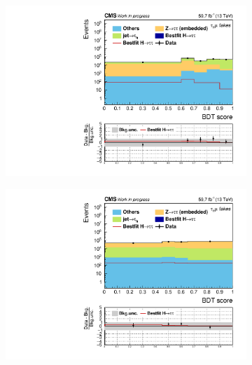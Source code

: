 \begin{figure}[!ht]
    \begin{subfigure}[b]{0.5\linewidth}
        \centering
        \includegraphics[scale=0.35]{Chapitre7/Images/histFakes2018_postfit.pdf} 
        \caption{} 
        \vspace{0.5ex}
    \end{subfigure}
    \begin{subfigure}[b]{0.5\linewidth}
        \centering
        \includegraphics[scale=0.35]{Chapitre7/Images/histZTT2018_postfit.pdf} 
        \caption{} 
        \vspace{0.5ex}
    \end{subfigure}
    \caption{}
    \label{BKGcategories}
\end{figure}

